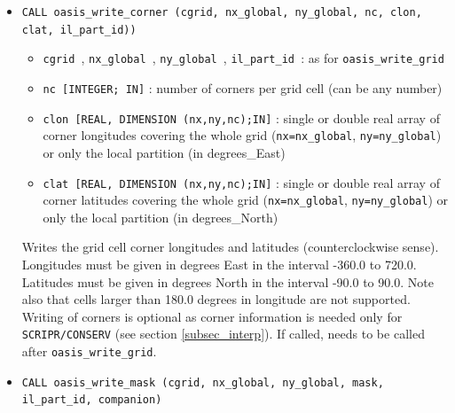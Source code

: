 \begin{itemize}
  \vspace{0.2cm}
\item {\tt CALL oasis\_write\_corner (cgrid, nx\_global, ny\_global, nc, clon, clat, il\_part\_id))}

  \begin{itemize}
  \item {\tt cgrid }, {\tt nx\_global }, {\tt ny\_global }, {\tt il\_part\_id }: as for {\tt oasis\_write\_grid}

  \item {\tt nc [INTEGER; IN]} : number of corners per grid cell (can be any number)
  \item {\tt clon [REAL, DIMENSION (nx,ny,nc);IN]} : single or double real array of corner
    longitudes covering the whole grid ({\tt nx=nx\_global}, {\tt ny=ny\_global}) or only the local partition (in degrees\_East)
  \item {\tt clat [REAL, DIMENSION (nx,ny,nc);IN]} : single or double real array of corner
    latitudes covering the whole grid ({\tt nx=nx\_global}, {\tt ny=ny\_global}) or only the local partition (in degrees\_North)
  \end{itemize}

  Writes the grid cell corner longitudes and latitudes
  (counterclockwise sense). Longitudes must be given in degrees East
  in the interval -360.0 to 720.0. Latitudes must be given in degrees
  North in the interval -90.0 to 90.0. Note also that cells larger
  than 180.0 degrees in longitude are not supported. Writing of
  corners is optional as corner information is needed only for {\tt
    SCRIPR/CONSERV} (see section \ref{subsec_interp}). If called,
  needs to be called after {\tt oasis\_write\_grid}.

  \vspace{0.2cm}
\item {\tt CALL oasis\_write\_mask (cgrid, nx\_global, ny\_global, mask, il\_part\_id, companion)}


\end{itemize}
